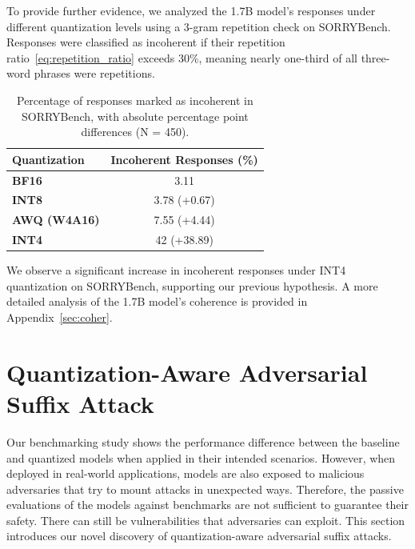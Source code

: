 \documentclass{article}
\newcommand{\de}[1]{\textcolor{crimsonred}{#1}}   %
\begin{document}
To provide further evidence, we analyzed the 1.7B model's responses under different quantization levels using a 3-gram repetition check on SORRYBench.
Responses were classified as incoherent if their repetition ratio~\ref{eq:repetition_ratio} exceeds 30\%, meaning nearly one-third of all three-word phrases were repetitions. 

\begin{table}[htbp]
\centering
\caption{Percentage of responses marked as incoherent in SORRYBench, with absolute percentage point differences (N = 450).}
\label{tab:3gram_split_SORRY}
\small
\setlength{\tabcolsep}{12pt}
\begin{tabular}{lc}
\toprule
\textbf{Quantization} & \textbf{Incoherent Responses (\%)} \\
\midrule
\textbf{BF16}        & 3.11 \\
\textbf{INT8}        & 3.78 \de{(+0.67)}  \\
\textbf{AWQ (W4A16)} & 7.55 \de{(+4.44)} \\
\textbf{INT4}        & 42 \de{(+38.89)} \\
\bottomrule
\end{tabular}
\end{table}

We observe a significant increase in incoherent responses under INT4 quantization on SORRYBench, supporting our previous hypothesis. 
A more detailed analysis of the 1.7B model's coherence is provided in Appendix~\ref{sec:coher}.

\FloatBarrier

\section{Quantization-Aware Adversarial Suffix Attack}

Our benchmarking study shows the performance difference between the baseline and quantized models when applied in their intended scenarios.
However, when deployed in real-world applications, models are also exposed to malicious adversaries that try to mount attacks in unexpected ways.
Therefore, the passive evaluations of the models against benchmarks are not sufficient to guarantee their safety. There can still be vulnerabilities that adversaries can exploit. 
This section introduces our novel discovery of quantization-aware adversarial suffix attacks.
\end{document}
